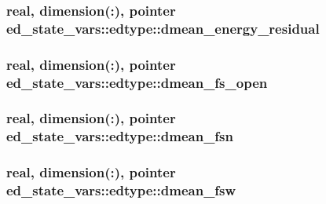 \subsubsection[{\texorpdfstring{dmean\+\_\+energy\+\_\+residual}{dmean_energy_residual}}]{\setlength{\rightskip}{0pt plus 5cm}real, dimension(\+:), pointer ed\+\_\+state\+\_\+vars\+::edtype\+::dmean\+\_\+energy\+\_\+residual}\hypertarget{structed__state__vars_1_1edtype_a6f72a015c28abd87618deec001de9514}{}\label{structed__state__vars_1_1edtype_a6f72a015c28abd87618deec001de9514}
\subsubsection[{\texorpdfstring{dmean\+\_\+fs\+\_\+open}{dmean_fs_open}}]{\setlength{\rightskip}{0pt plus 5cm}real, dimension(\+:), pointer ed\+\_\+state\+\_\+vars\+::edtype\+::dmean\+\_\+fs\+\_\+open}\hypertarget{structed__state__vars_1_1edtype_a8f627fbdc78de7581c0c9eb106ac8449}{}\label{structed__state__vars_1_1edtype_a8f627fbdc78de7581c0c9eb106ac8449}
\subsubsection[{\texorpdfstring{dmean\+\_\+fsn}{dmean_fsn}}]{\setlength{\rightskip}{0pt plus 5cm}real, dimension(\+:), pointer ed\+\_\+state\+\_\+vars\+::edtype\+::dmean\+\_\+fsn}\hypertarget{structed__state__vars_1_1edtype_a17c3c3c2b7d2d51b010a817cfe00b74a}{}\label{structed__state__vars_1_1edtype_a17c3c3c2b7d2d51b010a817cfe00b74a}
\subsubsection[{\texorpdfstring{dmean\+\_\+fsw}{dmean_fsw}}]{\setlength{\rightskip}{0pt plus 5cm}real, dimension(\+:), pointer ed\+\_\+state\+\_\+vars\+::edtype\+::dmean\+\_\+fsw}\hypertarget{structed__state__vars_1_1edtype_a68a8452c9597a8ef58ff89b54f73094e}{}\label{structed__state__vars_1_1edtype_a68a8452c9597a8ef58ff89b54f73094e}
